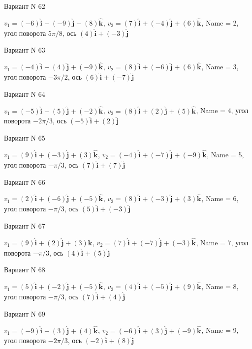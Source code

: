 \documentclass[11pt]{report}
\begin{document}
Вариант N 62

$v_1 = (-6)\mathbf{\hat{i}_{}} + (-9)\mathbf{\hat{j}_{}} + (8)\mathbf{\hat{k}_{}}$, $v_2 = (7)\mathbf{\hat{i}_{}} + (-4)\mathbf{\hat{j}_{}} + (6)\mathbf{\hat{k}_{}}$, Name = 2, угол поворота $5 \pi / 8$, ось $(4)\mathbf{\hat{i}_{}} + (-3)\mathbf{\hat{j}_{}}$

Вариант N 63

$v_1 = (-4)\mathbf{\hat{i}_{}} + (4)\mathbf{\hat{j}_{}} + (-9)\mathbf{\hat{k}_{}}$, $v_2 = (8)\mathbf{\hat{i}_{}} + (-6)\mathbf{\hat{j}_{}} + (6)\mathbf{\hat{k}_{}}$, Name = 3, угол поворота $- 3 \pi / 2$, ось $(6)\mathbf{\hat{i}_{}} + (-7)\mathbf{\hat{j}_{}}$

Вариант N 64

$v_1 = (-5)\mathbf{\hat{i}_{}} + (5)\mathbf{\hat{j}_{}} + (-2)\mathbf{\hat{k}_{}}$, $v_2 = (8)\mathbf{\hat{i}_{}} + (2)\mathbf{\hat{j}_{}} + (5)\mathbf{\hat{k}_{}}$, Name = 4, угол поворота $- 2 \pi / 3$, ось $(-5)\mathbf{\hat{i}_{}} + (2)\mathbf{\hat{j}_{}}$

Вариант N 65

$v_1 = (9)\mathbf{\hat{i}_{}} + (-3)\mathbf{\hat{j}_{}} + (3)\mathbf{\hat{k}_{}}$, $v_2 = (-4)\mathbf{\hat{i}_{}} + (-7)\mathbf{\hat{j}_{}} + (-9)\mathbf{\hat{k}_{}}$, Name = 5, угол поворота $- \pi / 3$, ось $(7)\mathbf{\hat{i}_{}} + (7)\mathbf{\hat{j}_{}}$

Вариант N 66

$v_1 = (2)\mathbf{\hat{i}_{}} + (-6)\mathbf{\hat{j}_{}} + (-5)\mathbf{\hat{k}_{}}$, $v_2 = (8)\mathbf{\hat{i}_{}} + (-3)\mathbf{\hat{j}_{}} + (3)\mathbf{\hat{k}_{}}$, Name = 6, угол поворота $- \pi / 3$, ось $(5)\mathbf{\hat{i}_{}} + (-3)\mathbf{\hat{j}_{}}$

Вариант N 67

$v_1 = (9)\mathbf{\hat{i}_{}} + (2)\mathbf{\hat{j}_{}} + (3)\mathbf{\hat{k}_{}}$, $v_2 = (7)\mathbf{\hat{i}_{}} + (-7)\mathbf{\hat{j}_{}} + (-3)\mathbf{\hat{k}_{}}$, Name = 7, угол поворота $- \pi / 3$, ось $(4)\mathbf{\hat{i}_{}} + (5)\mathbf{\hat{j}_{}}$

Вариант N 68

$v_1 = (5)\mathbf{\hat{i}_{}} + (-2)\mathbf{\hat{j}_{}} + (-5)\mathbf{\hat{k}_{}}$, $v_2 = (4)\mathbf{\hat{i}_{}} + (-5)\mathbf{\hat{j}_{}} + (9)\mathbf{\hat{k}_{}}$, Name = 8, угол поворота $- \pi / 3$, ось $(7)\mathbf{\hat{i}_{}} + (4)\mathbf{\hat{j}_{}}$

Вариант N 69

$v_1 = (-9)\mathbf{\hat{i}_{}} + (3)\mathbf{\hat{j}_{}} + (4)\mathbf{\hat{k}_{}}$, $v_2 = (-6)\mathbf{\hat{i}_{}} + (3)\mathbf{\hat{j}_{}} + (-9)\mathbf{\hat{k}_{}}$, Name = 9, угол поворота $- 2 \pi / 3$, ось $(-2)\mathbf{\hat{i}_{}} + (8)\mathbf{\hat{j}_{}}$
\end{document}
